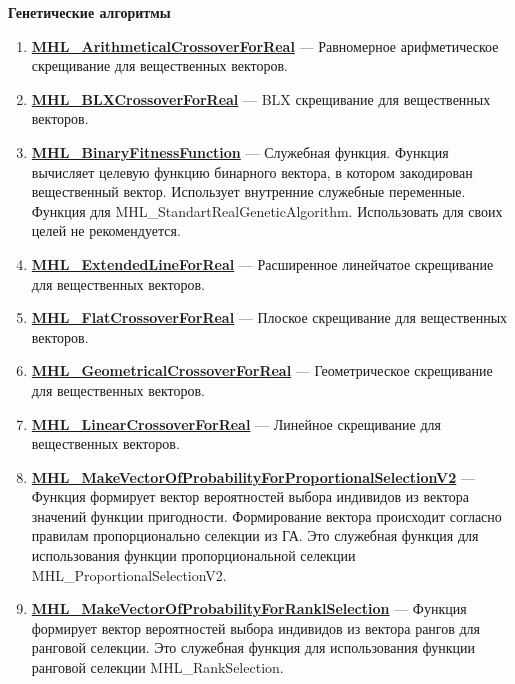 \documentclass[a4paper,12pt]{article}
\begin{document}
\textbf{Генетические алгоритмы}
\begin{enumerate}

\item \textbf{\hyperref[MHL_ArithmeticalCrossoverForReal]{MHL\_ArithmeticalCrossoverForReal}} --- Равномерное арифметическое скрещивание для вещественных векторов.

\item \textbf{\hyperref[MHL_BLXCrossoverForReal]{MHL\_BLXCrossoverForReal}} --- BLX скрещивание для вещественных векторов.

\item \textbf{\hyperref[MHL_BinaryFitnessFunction]{MHL\_BinaryFitnessFunction}} --- Служебная функция. Функция вычисляет целевую функцию бинарного вектора, в котором закодирован вещественный вектор. Использует внутренние служебные переменные. Функция для MHL\_StandartRealGeneticAlgorithm. Использовать для своих целей не рекомендуется.

\item \textbf{\hyperref[MHL_ExtendedLineForReal]{MHL\_ExtendedLineForReal}} --- Расширенное линейчатое скрещивание для вещественных векторов.

\item \textbf{\hyperref[MHL_FlatCrossoverForReal]{MHL\_FlatCrossoverForReal}} --- Плоское скрещивание для вещественных векторов.

\item \textbf{\hyperref[MHL_GeometricalCrossoverForReal]{MHL\_GeometricalCrossoverForReal}} --- Геометрическое скрещивание для вещественных векторов.

\item \textbf{\hyperref[MHL_LinearCrossoverForReal]{MHL\_LinearCrossoverForReal}} --- Линейное скрещивание для вещественных векторов.

\item \textbf{\hyperref[MHL_MakeVectorOfProbabilityForProportionalSelectionV2]{MHL\_MakeVectorOfProbabilityForProportionalSelectionV2}} --- Функция формирует вектор вероятностей выбора индивидов из вектора значений функции пригодности. Формирование вектора происходит согласно правилам пропорционально селекции из ГА. Это служебная функция для использования функции пропорциональной селекции MHL\_ProportionalSelectionV2.

\item \textbf{\hyperref[MHL_MakeVectorOfProbabilityForRanklSelection]{MHL\_MakeVectorOfProbabilityForRanklSelection}} --- Функция формирует вектор вероятностей выбора индивидов из вектора рангов для ранговой селекции. Это служебная функция для использования функции ранговой селекции MHL\_RankSelection.


\end{enumerate}
\end{document}
